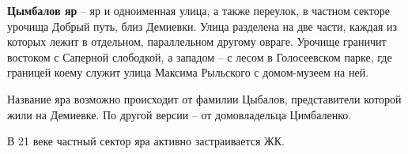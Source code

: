 \medskip

\textbf{Цымбалов яр} – яр и одноименная улица, а также переулок, в частном секторе урочища Добрый путь, близ Демиевки. Улица разделена на две части, каждая из которых лежит в отдельном, параллельном другому овраге. Урочище граничит востоком с Саперной слободкой, а западом – с лесом в Голосеевском парке, где границей коему служит улица Максима Рыльского с домом-музеем на ней.

Название яра возможно происходит от фамилии Цыбалов, представители которой жили на Демиевке. По другой версии – от домовладельца  Цимбаленко.

В 21 веке частный сектор яра активно застраивается ЖК.

